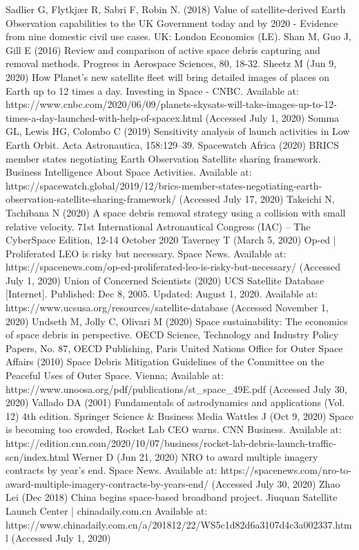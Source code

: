 \documentclass[12pt,a4paper,notitlepage,twoside,openright]{report}
\begin{document}
\begin{thebibliography}{100}
 Sadlier G, Flytkjær R, Sabri F, Robin N. (2018) Value of satellite-derived Earth Observation capabilities to the UK Government today and by 2020 - Evidence from nine domestic civil use cases. UK: London Economics (LE).
 Shan M, Guo J, Gill E (2016) Review and comparison of active space debris capturing and removal methods. Progress in Aerospace Sciences, 80, 18-32.
 Sheetz M (Jun 9, 2020) How Planet’s new satellite fleet will bring detailed images of places on Earth up to 12 times a day. Investing in Space - CNBC. Available at: https://www.cnbc.com/2020/06/09/planets-skysats-will-take-images-up-to-12-times-a-day-launched-with-help-of-spacex.html (Accessed July 1, 2020)
 Somma GL, Lewis HG, Colombo C (2019) Sensitivity analysis of launch activities in Low Earth Orbit. Acta Astronautica, 158:129–39.
 Spacewatch Africa (2020) BRICS member states negotiating Earth Observation Satellite sharing framework. Business Intelligence About Space Activities. Available at: https://spacewatch.global/2019/12/brics-member-states-negotiating-earth-observation-satellite-sharing-framework/ (Accessed July 17, 2020)
 Takeichi N, Tachibana N (2020) A space debris removal strategy using a collision with small relative velocity. 71st International Astronautical Congress (IAC) – The CyberSpace Edition, 12-14 October 2020
 Taverney T (March 5, 2020) Op-ed | Proliferated LEO is risky but necessary. Space News. Available at: https://spacenews.com/op-ed-proliferated-leo-is-risky-but-necessary/ (Accessed July 1, 2020)
 Union of Concerned Scientists (2020) UCS Satellite Database [Internet]. Published: Dec 8, 2005. Updated: August 1, 2020. Available at: https://www.ucsusa.org/resources/satellite-database (Accessed November 1, 2020)
 Undseth M, Jolly C, Olivari M (2020) Space sustainability: The economics of space debris in perspective. OECD Science, Technology and Industry Policy Papers, No. 87, OECD Publishing, Paris
 United Nations Office for Outer Space Affairs (2010) Space Debris Mitigation Guidelines of the Committee on the Peaceful Uses of Outer Space. Vienna; Available at: https://www.unoosa.org/pdf/publications/st_space_49E.pdf (Accessed July 30, 2020)
 Vallado DA (2001) Fundamentals of astrodynamics and applications (Vol. 12) 4th edition. Springer Science \& Business Media
 Wattles J (Oct 9, 2020) Space is becoming too crowded, Rocket Lab CEO warns. CNN Business. Available at: https://edition.cnn.com/2020/10/07/business/rocket-lab-debris-launch-traffic-scn/index.html
 Werner D (Jun 21, 2020) NRO to award multiple imagery contracts by year’s end. Space News. Available at: https://spacenews.com/nro-to-award-multiple-imagery-contracts-by-years-end/ (Accessed July 30, 2020)
 Zhao Lei (Dec 2018) China begins space-based broadband project. Jiuquan Satellite Launch Center | chinadaily.com.cn Available at: https://www.chinadaily.com.cn/a/201812/22/WS5c1d82d6a3107d4c3a002337.html (Accessed July 1, 2020)




\end{thebibliography}
\end{document}
